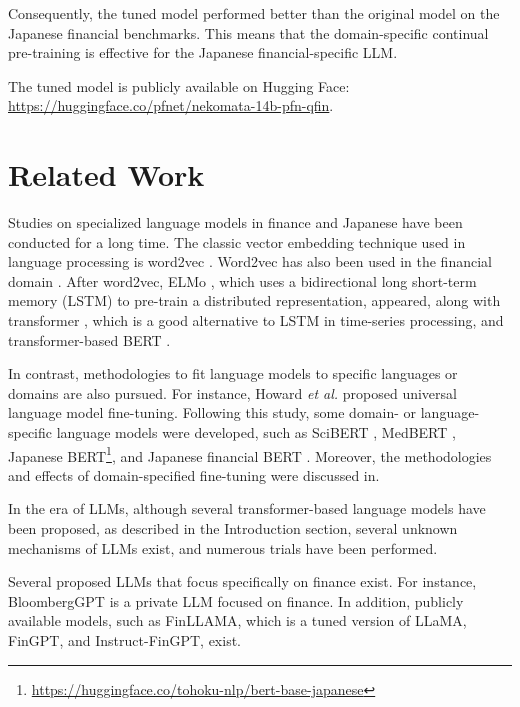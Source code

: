 Consequently, the tuned model performed better than the original model on the Japanese financial benchmarks.
This means that the domain-specific continual pre-training is effective for the Japanese financial-specific LLM.

The tuned model is publicly available on Hugging Face: \url{https://huggingface.co/pfnet/nekomata-14b-pfn-qfin}.

\section{Related Work}
Studies on specialized language models in finance and Japanese have been conducted for a long time.
The classic vector embedding technique used in language processing is word2vec \cite{Mikolov2013a}.
Word2vec has also been used in the financial domain \cite{Hirano2019-information}.
After word2vec, ELMo \cite{peters2018elmo}, which uses a bidirectional long short-term memory (LSTM) \cite{schuster1997bilstm} to pre-train a distributed representation, appeared, along with transformer \cite{Vaswani2017}, which is a good alternative to LSTM in time-series processing, and transformer-based BERT \cite{Devlin2018}.

In contrast, methodologies to fit language models to specific languages or domains are also pursued.
For instance, Howard {\it et al.} \cite{howard2018ulmfit} proposed universal language model fine-tuning.
Following this study, some domain- or language-specific language models were developed, such as SciBERT \cite{beltagy2019scibert}, MedBERT \cite{rasmy2021med}, Japanese BERT\footnote{\url{https://huggingface.co/tohoku-nlp/bert-base-japanese}}, and Japanese financial BERT \cite{Suzuki2022-sigfin28}.
Moreover, the methodologies and effects of domain-specified fine-tuning were discussed in\cite{gururangan2020don,Suzuku2023-ipm}.

In the era of LLMs, although several transformer-based language models have been proposed, as described in the Introduction section, several unknown mechanisms of LLMs exist, and numerous trials have been performed.

Several proposed LLMs that focus specifically on finance exist.
For instance, BloombergGPT\cite{Wu2023} is a private LLM focused on finance.
In addition, publicly available models, such as FinLLAMA\cite{Fin-LLAMA}, which is a tuned version of LLaMA\cite{touvron2023llama}, FinGPT\cite{yang2023fingpt}, and Instruct-FinGPT\cite{zhang2023instruct}, exist.

